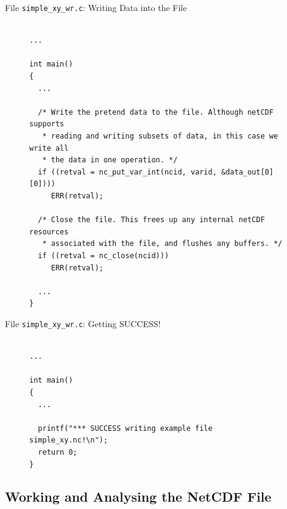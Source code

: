 \documentclass[compress,11pt,xcolor=svgnames,aspectratio=169]{beamer}
\begin{document}
\begin{frame}[fragile]{File \texttt{simple\_xy\_wr.c}: Writing Data into the File}

\begin{figure}
\centering
\begin{varwidth}{\linewidth}
{\tiny

\begin{verbatim}

...

int main()
{
  ...

  /* Write the pretend data to the file. Although netCDF supports
   * reading and writing subsets of data, in this case we write all
   * the data in one operation. */
  if ((retval = nc_put_var_int(ncid, varid, &data_out[0][0])))
     ERR(retval);

  /* Close the file. This frees up any internal netCDF resources
   * associated with the file, and flushes any buffers. */
  if ((retval = nc_close(ncid)))
     ERR(retval);

  ...
}

\end{verbatim}

}
\end{varwidth}
\end{figure}

\end{frame}

\begin{frame}[fragile]{File \texttt{simple\_xy\_wr.c}: Getting SUCCESS!}

\begin{figure}
\centering
\begin{varwidth}{\linewidth}
{\tiny

\begin{verbatim}

...

int main()
{
  ...

  printf("*** SUCCESS writing example file simple_xy.nc!\n");
  return 0;
}

\end{verbatim}

}
\end{varwidth}
\end{figure}

\end{frame}

\subsection{Working and Analysing the NetCDF File}
\end{document}
